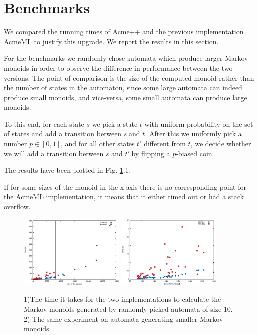 \section{Benchmarks}
We compared the running times of Acme++ and the previous
implementation AcmeML to justify this upgrade. We report the results
in this section.

For the benchmarks we randomly chose automata which produce larger
Markov monoids in order to observe the difference in performance
between the two versions. The point of comparison is the size of the
computed monoid rather than the number of states in the automaton,
since some large automata can indeed produce small monoids, and
vice-versa, some small automata can produce large monoids.

To this end, for each state $s$ we pick a state $t$ with uniform
probability on the set of states and add a transition between $s$ and
$t$. After this we uniformly pick a number $p\in[0,1]$, and for all
other states $t'$ different from $t$, we decide whether we will add a
transition between $s$ and $t'$ by flipping a $p$-biased coin.

The results have been plotted in Fig. \ref{bench1}.1. 

If for some sizes of the monoid in the x-axis there is no
corresponding point for the AcmeML implementation, it means that it
either timed out or had a stack overflow.

\begin{figure}[h!]
  \begin{center}
    \includegraphics[width=0.45\textwidth]{graph/lines}
    \includegraphics[width=0.45\textwidth]{graph/zoomlines}
    \caption{1)The time it takes for the two implementations to
      calculate the Markov monoids generated by randomly picked
      automata of size 10. 2) The same experiment on automata
      generating smaller Markov monoids}
      \label{bench1}
  \end{center}  
\end{figure}

